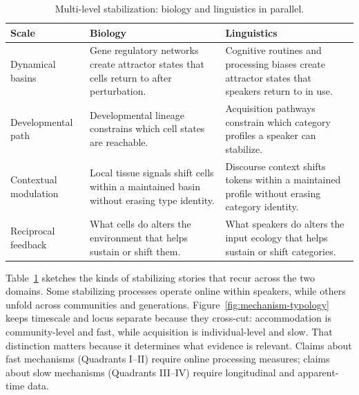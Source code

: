 \begin{table}[htbp]
\centering
\small
\begin{tabular}{@{}p{2.8cm}p{5.5cm}p{5.5cm}@{}}
\toprule
\textbf{Scale} & \textbf{Biology} & \textbf{Linguistics} \\
\midrule
Dynamical basins & Gene regulatory networks create attractor states that cells return to after perturbation. & Cognitive routines and processing biases create attractor states that speakers return to in use. \\
\addlinespace
Developmental path & Developmental lineage constrains which cell states are reachable. & Acquisition pathways constrain which category profiles a speaker can stabilize. \\
\addlinespace
Contextual modulation & Local tissue signals shift cells within a maintained basin without erasing type identity. & Discourse context shifts tokens within a maintained profile without erasing category identity. \\
\addlinespace
Reciprocal feedback & What cells do alters the environment that helps sustain or shift them. & What speakers do alters the input ecology that helps sustain or shift categories. \\
\bottomrule
\end{tabular}
\caption{Multi-level stabilization: biology and linguistics in parallel.}
\label{tab:stabilizer-parallel}
\end{table}

Table~\ref{tab:stabilizer-parallel} sketches the kinds of stabilizing stories that recur across the two domains. Some stabilizing processes operate online within speakers, while others unfold across communities and generations. Figure~\ref{fig:mechanism-typology} keeps timescale and locus separate because they cross-cut: accommodation is community-level and fast, while acquisition is individual-level and slow. That distinction matters because it determines what evidence is relevant. Claims about fast mechanisms (Quadrants I--II) require online processing measures; claims about slow mechanisms (Quadrants III--IV) require longitudinal and apparent-time data.

